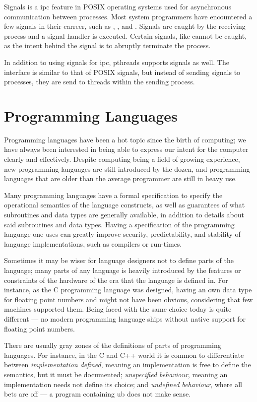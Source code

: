 Signals is a \gls{ipc} feature in POSIX operating systems used for asynchronous communication
between processes. Most system programmers have encountered a few signals in their carreer, such as
, ,  and . Signals are caught by the
receiving process and a signal handler is executed. Certain signals, like  cannot be
caught, as the intent behind the signal is to abruptly terminate the process.

In addition to using signals for \gls{ipc}, \gls{pthreads} supports signals as well. The interface
is similar to that of POSIX signals, but instead of sending signals to processes, they are send to
threads within the sending process.


\section{Programming Languages\label{sec:background-pl}}

Programming languages have been a hot topic since the birth of computing; we have always been
interested in being able to express our intent for the computer clearly and effectively. Despite
computing being a field of growing experience, new programming languages are still introduced by
the dozen, and programming languages that are older than the average programmer are still in heavy
use.

Many programming languages have a formal specification to specify the operational semantics of the
language constructs, as well as guarantees of what subroutines and data types are generally
available, in addition to details about said subroutines and data types. Having a specification of
the programming language one uses can greatly improve security, predictability, and stability of
language implementations, such as compilers or run-times.

Sometimes it may be wiser for language designers not to define parts of the language; many parts of
any language is heavily introduced by the features or constraints of the hardware of the era that
the language is defined in. For instance, as the C programming language was designed, having an own
data type for floating point numbers  and  might not have been obvious,
considering that few machines supported them. Being faced with the same choice today is quite
different --- no modern programming language ships without native support for floating point
numbers.

There are usually gray zones of the definitions of parts of programming languages. For instance, in
the C and C++ world it is common to differentiate between \emph{implementation defined}, meaning an
implementation is free to define the semantics, but it must be documented; \emph{unspecified
behaviour}, meaning an implementation needs not define its choice; and \emph{undefined behaviour},
where all bets are off --- a program containing \gls{ub} does not make sense.

